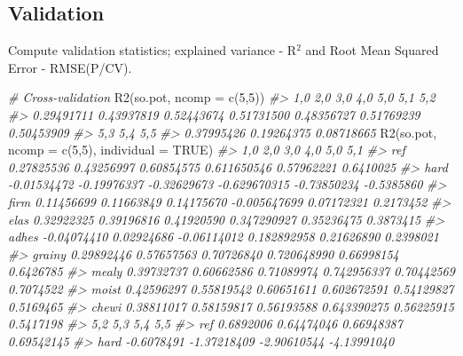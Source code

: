 \documentclass[
]{article}
\newenvironment{Shaded}{\begin{snugshade}}{\end{snugshade}}
\newcommand{\AttributeTok}[1]{\textcolor[rgb]{0.77,0.63,0.00}{#1}}
\newcommand{\CommentTok}[1]{\textcolor[rgb]{0.56,0.35,0.01}{\textit{#1}}}
\newcommand{\ConstantTok}[1]{\textcolor[rgb]{0.00,0.00,0.00}{#1}}
\newcommand{\DecValTok}[1]{\textcolor[rgb]{0.00,0.00,0.81}{#1}}
\newcommand{\FunctionTok}[1]{\textcolor[rgb]{0.00,0.00,0.00}{#1}}
\newcommand{\NormalTok}[1]{#1}
\begin{document}
\hypertarget{validation}{%
\subsection{Validation}\label{validation}}

Compute validation statistics; explained variance - R\(^2\) and Root
Mean Squared Error - RMSE(P/CV).

\begin{Shaded}
\begin{Highlighting}[]
\CommentTok{\# Cross{-}validation}
\FunctionTok{R2}\NormalTok{(so.pot, }\AttributeTok{ncomp =} \FunctionTok{c}\NormalTok{(}\DecValTok{5}\NormalTok{,}\DecValTok{5}\NormalTok{))}
\CommentTok{\#\textgreater{}        1,0        2,0        3,0        4,0        5,0        5,1        5,2 }
\CommentTok{\#\textgreater{} 0.29491711 0.43937819 0.52443674 0.51731500 0.48356727 0.51769239 0.50453909 }
\CommentTok{\#\textgreater{}        5,3        5,4        5,5 }
\CommentTok{\#\textgreater{} 0.37995426 0.19264375 0.08718665}
\FunctionTok{R2}\NormalTok{(so.pot, }\AttributeTok{ncomp =} \FunctionTok{c}\NormalTok{(}\DecValTok{5}\NormalTok{,}\DecValTok{5}\NormalTok{), }\AttributeTok{individual =} \ConstantTok{TRUE}\NormalTok{)}
\CommentTok{\#\textgreater{}                1,0         2,0         3,0          4,0         5,0        5,1}
\CommentTok{\#\textgreater{} ref     0.27825536  0.43256997  0.60854575  0.611650546  0.57962221  0.6410025}
\CommentTok{\#\textgreater{} hard   {-}0.01534472 {-}0.19976337 {-}0.32629673 {-}0.629670315 {-}0.73850234 {-}0.5385860}
\CommentTok{\#\textgreater{} firm    0.11456699  0.11663849  0.14175670 {-}0.005647699  0.07172321  0.2173452}
\CommentTok{\#\textgreater{} elas    0.32922325  0.39196816  0.41920590  0.347290927  0.35236475  0.3873415}
\CommentTok{\#\textgreater{} adhes  {-}0.04074410  0.02924686 {-}0.06114012  0.182892958  0.21626890  0.2398021}
\CommentTok{\#\textgreater{} grainy  0.29892446  0.57657563  0.70726840  0.720648990  0.66998154  0.6426785}
\CommentTok{\#\textgreater{} mealy   0.39732737  0.60662586  0.71089974  0.742956337  0.70442569  0.7074522}
\CommentTok{\#\textgreater{} moist   0.42596297  0.55819542  0.60651611  0.602672591  0.54129827  0.5169465}
\CommentTok{\#\textgreater{} chewi   0.38811017  0.58159817  0.56193588  0.643390275  0.56225915  0.5417198}
\CommentTok{\#\textgreater{}               5,2         5,3         5,4         5,5}
\CommentTok{\#\textgreater{} ref     0.6892006  0.64474046  0.66948387  0.69542145}
\CommentTok{\#\textgreater{} hard   {-}0.6078491 {-}1.37218409 {-}2.90610544 {-}4.13991040}

\end{Highlighting}
\end{Shaded}
\end{document}
